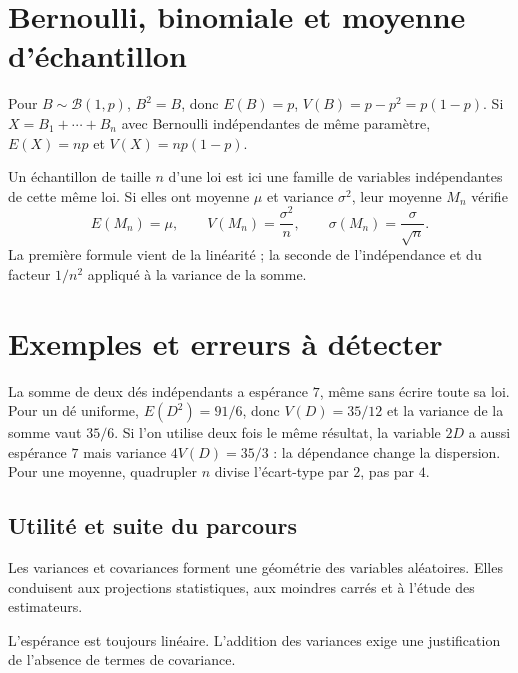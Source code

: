 \documentclass[../cours_tle.tex]{subfiles}
\begin{document}
\section{Bernoulli, binomiale et moyenne d'échantillon}
Pour $B\sim\mathcal B(1,p)$, $B^2=B$, donc $E(B)=p$, $V(B)=p-p^2=p(1-p)$.
Si $X=B_1+\cdots+B_n$ avec Bernoulli indépendantes de même paramètre,
$E(X)=np$ et $V(X)=np(1-p)$.

Un échantillon de taille $n$ d'une loi est ici une famille de variables indépendantes de cette même loi. Si elles ont moyenne $\mu$ et variance $\sigma^2$, leur moyenne $M_n$ vérifie
\[
E(M_n)=\mu,\qquad V(M_n)=\frac{\sigma^2}{n},\qquad \sigma(M_n)=\frac{\sigma}{\sqrt n}.
\]
La première formule vient de la linéarité ; la seconde de l'indépendance et du facteur $1/n^2$ appliqué à la variance de la somme.
\section{Exemples et erreurs à détecter}
La somme de deux dés indépendants a espérance $7$, même sans écrire toute sa loi.
Pour un dé uniforme, $E(D^2)=91/6$, donc $V(D)=35/12$ et la variance de la somme vaut $35/6$.
Si l'on utilise deux fois le même résultat, la variable $2D$ a aussi espérance $7$ mais variance $4V(D)=35/3$ : la dépendance change la dispersion.
Pour une moyenne, quadrupler $n$ divise l'écart-type par $2$, pas par $4$.
\begin{finchapitre}
\section{Utilité et suite du parcours}
Les variances et covariances forment une géométrie des variables aléatoires. Elles conduisent aux projections statistiques, aux moindres carrés et à l'étude des estimateurs.
\begin{retenir}
L'espérance est toujours linéaire. L'addition des variances exige une justification de l'absence de termes de covariance.
\end{retenir}
\end{finchapitre}
\end{document}
